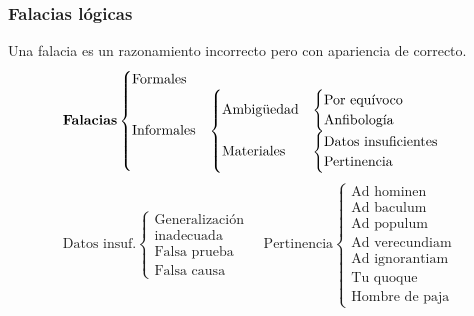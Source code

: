 \subsubsection{Falacias lógicas} 
Una \gls{falacia} es un razonamiento incorrecto pero con apariencia de correcto. 
\[ \mbox{\textbf{Falacias}}
\begin{cases}
	\mbox{Formales}&\\
	\mbox{Informales} & \begin{cases}
		\mbox{Ambigüedad} & \begin{cases}
			\mbox{Por equívoco}&\\
			\mbox{Anfibología} & 
		\end{cases}\\
		\mbox{Materiales} & \begin{cases}
			\mbox{Datos insuficientes} & \\
			\mbox{Pertinencia}
		\end{cases}
	\end{cases}
\end{cases}	
\]
\vspace{-1mm}
\[ \mbox{Datos insuf.} \begin{cases}
	\mbox{Generalización}\\
	\mbox{inadecuada}\\
	\mbox{Falsa prueba}\\
	\mbox{Falsa causa}
\end{cases} \quad \mbox{Pertinencia} \begin{cases}
	\mbox{Ad hominen}\\
	\mbox{Ad baculum}\\
	\mbox{Ad populum}\\
	\mbox{Ad verecundiam}\\
	\mbox{Ad ignorantiam}\\
	\mbox{Tu quoque}\\
	\mbox{Hombre de paja}
\end{cases}\]

